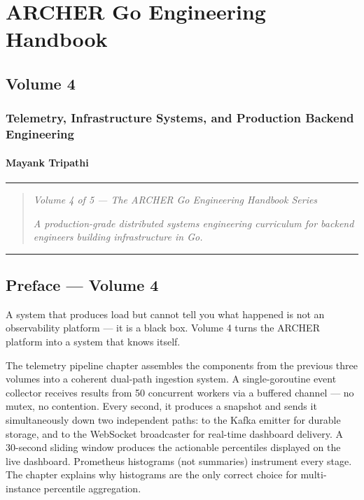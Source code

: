 \documentclass[
]{article}
\author{}
\date{}
\begin{document}
\hypertarget{archer-go-engineering-handbook}{%
\section{ARCHER Go Engineering
Handbook}\label{archer-go-engineering-handbook}}

\hypertarget{volume-4}{%
\subsection{Volume 4}\label{volume-4}}

\hypertarget{telemetry-infrastructure-systems-and-production-backend-engineering}{%
\subsubsection{Telemetry, Infrastructure Systems, and Production Backend
Engineering}\label{telemetry-infrastructure-systems-and-production-backend-engineering}}

\hypertarget{mayank-tripathi}{%
\paragraph{Mayank Tripathi}\label{mayank-tripathi}}

\begin{center}\rule{0.5\linewidth}{0.5pt}\end{center}

\begin{quote}
\emph{Volume 4 of 5 --- The ARCHER Go Engineering Handbook Series}

\emph{A production-grade distributed systems engineering curriculum for
backend engineers building infrastructure in Go.}
\end{quote}

\begin{center}\rule{0.5\linewidth}{0.5pt}\end{center}

\hypertarget{preface-volume-4}{%
\subsection{Preface --- Volume 4}\label{preface-volume-4}}

A system that produces load but cannot tell you what happened is not an
observability platform --- it is a black box. Volume 4 turns the ARCHER
platform into a system that knows itself.

The telemetry pipeline chapter assembles the components from the
previous three volumes into a coherent dual-path ingestion system. A
single-goroutine event collector receives results from 50 concurrent
workers via a buffered channel --- no mutex, no contention. Every
second, it produces a snapshot and sends it simultaneously down two
independent paths: to the Kafka emitter for durable storage, and to the
WebSocket broadcaster for real-time dashboard delivery. A 30-second
sliding window produces the actionable percentiles displayed on the live
dashboard. Prometheus histograms (not summaries) instrument every stage.
The chapter explains why histograms are the only correct choice for
multi-instance percentile aggregation.
\end{document}
